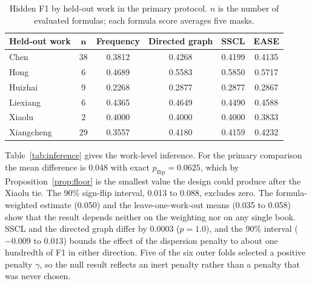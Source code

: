 \documentclass[10pt,a4paper]{article}
\begin{document}
\begin{table}[H]
\caption{Hidden F1 by held-out work in the primary protocol. $n$ is the number of evaluated formulas; each formula score averages five masks.}
\label{tab:works-f1}
\small
\begin{tabularx}{\textwidth}{lcCCCC}
\toprule
\textbf{Held-out work} & $\bm n$ & \textbf{Frequency} & \textbf{Directed graph} & \textbf{SSCL} & \textbf{EASE} \\
\midrule
Chen & 38 & 0.3812 & 0.4268 & 0.4199 & 0.4135 \\
Hong & 6 & 0.4689 & 0.5583 & 0.5850 & 0.5717 \\
Huizhai & 9 & 0.2268 & 0.2877 & 0.2877 & 0.2867 \\
Liexiang & 6 & 0.4365 & 0.4649 & 0.4490 & 0.4588 \\
Xiaolu & 2 & 0.4000 & 0.4000 & 0.4000 & 0.3833 \\
Xiangcheng & 29 & 0.3557 & 0.4180 & 0.4159 & 0.4232 \\
\bottomrule
\end{tabularx}
\end{table}

Table~\ref{tab:inference} gives the work-level inference. For the primary comparison the mean difference is 0.048 with exact $p_{\mathrm{flip}}=0.0625$, which by Proposition~\ref{prop:floor} is the smallest value the design could produce after the Xiaolu tie. The 90\% sign-flip interval, 0.013 to 0.088, excludes zero. The formula-weighted estimate (0.050) and the leave-one-work-out means (0.035 to 0.058) show that the result depends neither on the weighting nor on any single book. SSCL and the directed graph differ by 0.0003 ($p=1.0$), and the 90\% interval ($-0.009$ to $0.013$) bounds the effect of the dispersion penalty to about one hundredth of F1 in either direction. Five of the six outer folds selected a positive penalty $\gamma$, so the null result reflects an inert penalty rather than a penalty that was never chosen.
\end{document}
